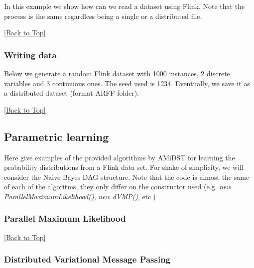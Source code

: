 \documentclass[10pt,a4paper]{article}
\newcommand{\includejavasource}[1]{}
\begin{document}
In this example we show how can we read a dataset using Flink. Note that the process is the same regardless being a single or a distributed file.

\includejavasource{../../../../examples/src/main/java/eu/amidst/flinklink/examples/io/DataStreamLoaderExample.java}


\hyperref[sec:flinklink]{[Back to Top]}\newline 


\subsubsection{Writing data}\label{sec:flinklink:io:write}


Below we generate a random Flink dataset with 1000 instances, 2 discrete variables and 3 continuous ones. The seed used is 1234. Eventually, we save it as a distributed dataset (format ARFF folder).
\includejavasource{../../../../examples/src/main/java/eu/amidst/flinklink/examples/io/DataStreamWriterExample.java}

\hyperref[sec:flinklink]{[Back to Top]}\newline 




\subsection{Parametric learning}\label{sec:flinklink:learning}

Here give examples of the provided algorithms by AMiDST for learning the probability distributions from a Flink data set. For shake of simplicity, we will consider the Naive Bayes DAG structure. Note that the code is almost the same of each of the algoritms, they only differ on the constructor used (e.g. \textit{new ParallelMaximumLikelihood()}, \textit{new dVMP()}, etc.)


\subsubsection{Parallel Maximum Likelihood}\label{sec:flinklink:learning:pml}

\includejavasource{../../../../examples/src/main/java/eu/amidst/flinklink/examples/learning/ParallelMLExample.java}

\hyperref[sec:flinklink]{[Back to Top]}\newline 


\subsubsection{Distributed Variational Message Passing}\label{sec:flinklink:learning:dvmp}
\end{document}
